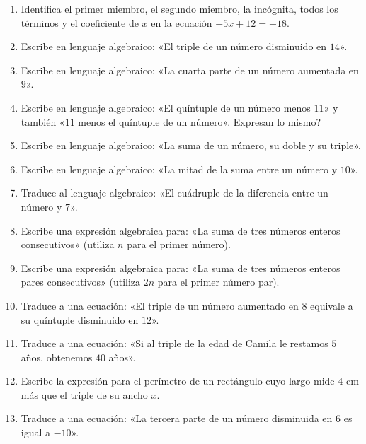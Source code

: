 \documentclass[12pt, letterpaper]{article}
\begin{document}
\begin{enumerate}[leftmargin=*]
  \item \facil{} Identifica el primer miembro, el segundo miembro, la incógnita, todos los términos y el coeficiente de $x$ en la ecuación $-5x + 12 = -18$.

  \item \facil{} Escribe en lenguaje algebraico: «El triple de un número disminuido en $14$».

  \item \facil{} Escribe en lenguaje algebraico: «La cuarta parte de un número aumentada en $9$».

  \item \facil{} Escribe en lenguaje algebraico: «El quíntuple de un número menos $11$» y también «$11$ menos el quíntuple de un número». \textquestiondown Expresan lo mismo?

  \item \facil{} Escribe en lenguaje algebraico: «La suma de un número, su doble y su triple».

  \item \medio{} Escribe en lenguaje algebraico: «La mitad de la suma entre un número y $10$».

  \item \medio{} Traduce al lenguaje algebraico: «El cuádruple de la diferencia entre un número y $7$».

  \item \medio{} Escribe una expresión algebraica para: «La suma de tres números enteros consecutivos» (utiliza $n$ para el primer número).

  \item \medio{} Escribe una expresión algebraica para: «La suma de tres números enteros pares consecutivos» (utiliza $2n$ para el primer número par).

  \item \medio{} Traduce a una ecuación: «El triple de un número aumentado en $8$ equivale a su quíntuple disminuido en $12$».

  \item \medio{} Traduce a una ecuación: «Si al triple de la edad de Camila le restamos $5$ años, obtenemos $40$ años».

  \item \medio{} Escribe la expresión para el perímetro de un rectángulo cuyo largo mide $4$ cm más que el triple de su ancho $x$.

  \item \medio{} Traduce a una ecuación: «La tercera parte de un número disminuida en $6$ es igual a $-10$».


\end{enumerate}
\end{document}
